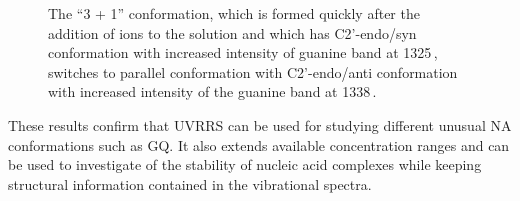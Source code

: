 \begin{figure}[ht]
	\centering
	
	\vspace{3mm}
	\caption[%
		Effect of standard anealing and incubation at 37\,\textdegree{}C on UVRRS
		of -Tel22.
	]{%
		The “3 + 1” conformation, which is formed quickly after the addition of
		 ions to the solution and which has C2'-endo/syn conformation with
		increased intensity of guanine band at 1325\,\icm{}, switches to parallel
		conformation with C2'-endo/anti conformation with increased intensity of
		the guanine band at 1338\,\icm{}.
	}
	\label{\figlabel{telXXII:spectra}}
\end{figure}

These results confirm that UVRRS can be used for studying
different unusual NA conformations such as GQ. It also extends available
concentration ranges and can be used to investigate of the stability of
nucleic acid complexes while keeping structural information contained in the
vibrational spectra.
